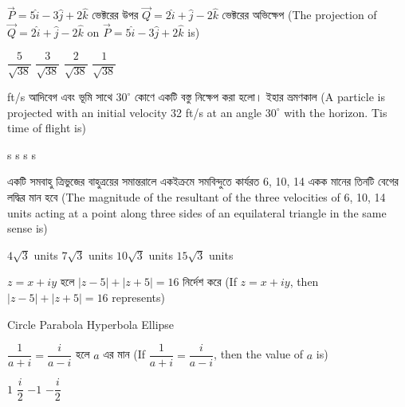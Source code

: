\documentclass[addpoints]{exam}
\begin{document}
\begin{questions}
\question  $ \vec{P} = 5\hat{i}-3\hat{j}+2\hat{k} $  ভেক্টরের উপর $ \vec{Q} = 2\hat{i}+\hat{j}-2\hat{k} $ ভেক্টরের অভিক্ষেপ (The projection of $ \vec{Q} = 2\hat{i}+\hat{j}-2\hat{k} $ on $ \vec{P} = 5\hat{i}-3\hat{j}+2\hat{k} $ is)

\begin{oneparchoices}
\choice $ \dfrac{5}{\sqrt{38}} $
\choice $ \dfrac{3}{\sqrt{38}} $
\choice $ \dfrac{2}{\sqrt{38}} $
\choice  $ \dfrac{1}{\sqrt{38}} $

\end{oneparchoices}


 ft/s  আদিবেগ এবং ভূমি সাথে $ 30^{\circ} $ কোণে একটি বস্তু নিক্ষেপ করা হলো। ইহার ভ্রমণকাল (A particle is projected with an initial velocity 32 ft/s at an angle $ 30^{\circ} $ with the horizon. Tis time of flight is)

\begin{oneparchoices}
 s
 s
 s
 s

\end{oneparchoices}

\question   একটি সমবাহু ত্রিভুজের বাহুত্রয়ের সমান্তরালে একইক্রমে সমবিন্দুতে কার্যরত 6, 10, 14 একক মানের তিনটি বেগের লদ্ধির মান হবে (The magnitude of the resultant of the three velocities of 6, 10, 14 units acting at a point along three sides of an equilateral triangle in the same sense is)

\begin{oneparchoices}
\choice $ 4\sqrt{3} $ units
\choice $ 7\sqrt{3} $ units
\choice $ 10\sqrt{3} $ units
\choice  $ 15\sqrt{3} $ units

\end{oneparchoices}

\question   $ z=x+iy $ হলে $ |z-5| + |z+5| = 16 $ নির্দেশ করে (If $ z=x+iy $, then $ |z-5| + |z+5| = 16 $ represents)

\begin{oneparchoices}
\choice Circle
\choice Parabola
\choice Hyperbola
\choice Ellipse

\end{oneparchoices}

\question  $ \dfrac{1}{a+i} = \dfrac{i}{a-i} $  হলে $ a $ এর মান (If $ \dfrac{1}{a+i} = \dfrac{i}{a-i} $, then the value of $ a $ is)

\begin{oneparchoices}
\choice $ 1 $
\choice $ \dfrac{i}{2} $
\choice $ -1 $
\choice  $ -\dfrac{i}{2} $

\end{oneparchoices}


\end{questions}
\end{document}
